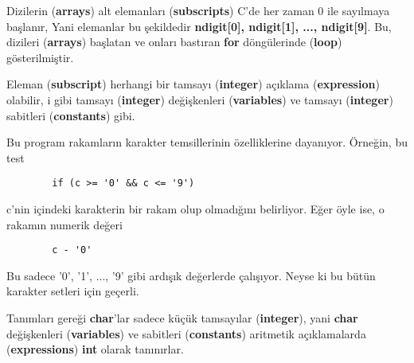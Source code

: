 \documentclass[a4paper,12pt,oneside]{book}
\begin{document}
\noindent Dizilerin (\textbf{arrays}) alt elemanları (\textbf{subscripts}) C'de her zaman 0 ile sayılmaya başlanır, Yani elemanlar bu şekildedir \textbf{ndigit[0], ndigit[1], ..., ndigit[9]}. Bu, dizileri (\textbf{arrays}) başlatan ve onları bastıran \textbf{for} döngülerinde (\textbf{loop}) gösterilmiştir.
\par Eleman (\textbf{subscript}) herhangi bir tamsayı (\textbf{integer}) açıklama (\textbf{expression}) olabilir, i gibi tamsayı (\textbf{integer}) değişkenleri (\textbf{variables}) ve tamsayı (\textbf{integer}) sabitleri (\textbf{constants}) gibi.
\par Bu program rakamların karakter temsillerinin özelliklerine dayanıyor. Örneğin, bu test
\begin{lstlisting}
		if (c >= '0' && c <= '9')
\end{lstlisting}
c'nin içindeki karakterin bir rakam olup olmadığını belirliyor. Eğer öyle ise, o rakamın numerik değeri
\begin{lstlisting}
		c - '0'
\end{lstlisting}
\noindent Bu sadece '0', '1', ..., '9' gibi ardışık değerlerde çalışıyor. Neyse ki bu bütün karakter setleri için geçerli.
\par Tanımları gereği \textbf{char}'lar sadece küçük tamsayılar (\textbf{integer}), yani \textbf{char} değişkenleri (\textbf{variables}) ve sabitleri (\textbf{constants}) aritmetik açıklamalarda (\textbf{expressions}) \textbf{int} olarak tanınırlar.
\end{document}

